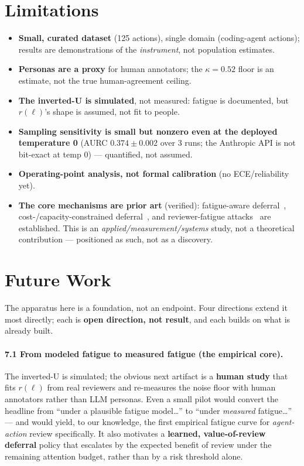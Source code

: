 \documentclass[11pt]{article}
\begin{document}
\section{Limitations}\label{sec:limitations}

\begin{itemize}
  \item \textbf{Small, curated dataset} (125 actions), single domain (coding-agent actions); results
  are demonstrations of the \emph{instrument}, not population estimates.
  \item \textbf{Personas are a proxy} for human annotators; the $\kappa = 0.52$ floor is an estimate,
  not the true human-agreement ceiling.
  \item \textbf{The inverted-U is simulated}, not measured: fatigue is documented, but $r(\ell)$'s
  shape is assumed, not fit to people.
  \item \textbf{Sampling sensitivity is small but nonzero even at the deployed temperature 0} (AURC
  $0.374 \pm 0.002$ over 3 runs; the Anthropic API is not bit-exact at temp 0) --- quantified, not
  assumed.
  \item \textbf{Operating-point analysis, not formal calibration} (no ECE/reliability yet).
  \item \textbf{The core mechanisms are prior art} (verified): fatigue-aware
  deferral~\cite{falcon}, cost-/capacity-constrained deferral~\cite{deccaf}, and reviewer-fatigue
  attacks~\cite{tariq25} are established. This is
  an \emph{applied/measurement/systems} study, not a theoretical contribution --- positioned as such,
  not as a discovery.
\end{itemize}

\section{Future Work}\label{sec:future}

The apparatus here is a foundation, not an endpoint. Four directions extend it most directly; each is
\textbf{open direction, not result}, and each builds on what is already built.

\paragraph{7.1 From modeled fatigue to measured fatigue (the empirical core).} The inverted-U is
simulated; the obvious next artifact is a \textbf{human study} that fits $r(\ell)$ from real reviewers
and re-measures the noise floor with human annotators rather than LLM personas. Even a small pilot
would convert the headline from ``under a plausible fatigue model\ldots'' to ``under \emph{measured}
fatigue\ldots'' --- and would yield, to our knowledge, the first empirical fatigue curve for
\emph{agent-action} review specifically. It also motivates a \textbf{learned, value-of-review
deferral} policy that escalates by the expected benefit of review under the remaining attention
budget, rather than by a risk threshold alone.
\end{document}
